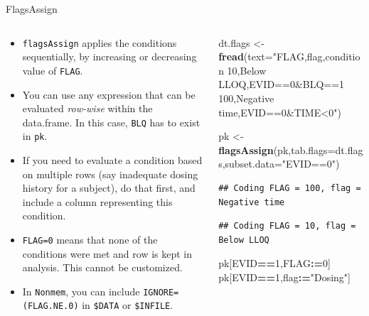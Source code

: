 \documentclass[
  8pt,
  ignorenonframetext,
  aspectratio=169]{beamer}
\newenvironment{Shaded}{\begin{snugshade}}{\end{snugshade}}
\newcommand{\DataTypeTok}[1]{\textcolor[rgb]{0.13,0.29,0.53}{#1}}
\newcommand{\DecValTok}[1]{\textcolor[rgb]{0.00,0.00,0.81}{#1}}
\newcommand{\ErrorTok}[1]{\textcolor[rgb]{0.64,0.00,0.00}{\textbf{#1}}}
\newcommand{\KeywordTok}[1]{\textcolor[rgb]{0.13,0.29,0.53}{\textbf{#1}}}
\newcommand{\NormalTok}[1]{#1}
\newcommand{\OperatorTok}[1]{\textcolor[rgb]{0.81,0.36,0.00}{\textbf{#1}}}
\newcommand{\StringTok}[1]{\textcolor[rgb]{0.31,0.60,0.02}{#1}}
\providecommand{\tightlist}{%
  \setlength{\itemsep}{0pt}\setlength{\parskip}{0pt}}
\begin{document}
\begin{frame}[fragile]{FlagsAssign}
\protect\hypertarget{flagsassign}{}
\begin{columns}[T]
\begin{column}{0.48\textwidth}
\begin{itemize}
\tightlist
\item
  \texttt{flagsAssign} applies the conditions sequentially, by
  increasing or decreasing value of \texttt{FLAG}.
\item
  You can use any expression that can be evaluated \emph{row-wise}
  within the data.frame. In this case, \texttt{BLQ} has to exist in
  \texttt{pk}.
\item
  If you need to evaluate a condition based on multiple rows (say
  inadequate dosing history for a subject), do that first, and include a
  column representing this condition.
\item
  \texttt{FLAG=0} means that none of the conditions were met and row is
  kept in analysis. This cannot be customized.
\item
  In \texttt{Nonmem}, you can include \texttt{IGNORE=(FLAG.NE.0)} in
  \texttt{\$DATA} or \texttt{\$INFILE}.
\end{itemize}
\end{column}

\begin{column}{0.48\textwidth}
\footnotesize

\begin{Shaded}
\begin{Highlighting}[]
\NormalTok{dt.flags \textless{}{-}}\StringTok{ }\KeywordTok{fread}\NormalTok{(}\DataTypeTok{text=}\StringTok{"FLAG,flag,condition}
\StringTok{10,Below LLOQ,EVID==0\&BLQ==1}
\StringTok{100,Negative time,EVID==0\&TIME\textless{}0"}\NormalTok{)}

\NormalTok{pk \textless{}{-}}\StringTok{ }\KeywordTok{flagsAssign}\NormalTok{(pk,}\DataTypeTok{tab.flags=}\NormalTok{dt.flags,}\DataTypeTok{subset.data=}\StringTok{"EVID==0"}\NormalTok{)}
\end{Highlighting}
\end{Shaded}

\begin{verbatim}
## Coding FLAG = 100, flag = Negative time
\end{verbatim}

\begin{verbatim}
## Coding FLAG = 10, flag = Below LLOQ
\end{verbatim}

\begin{Shaded}
\begin{Highlighting}[]
\NormalTok{pk[EVID}\OperatorTok{==}\DecValTok{1}\NormalTok{,FLAG}\OperatorTok{:}\ErrorTok{=}\DecValTok{0}\NormalTok{]}
\NormalTok{pk[EVID}\OperatorTok{==}\DecValTok{1}\NormalTok{,flag}\OperatorTok{:}\ErrorTok{=}\StringTok{"Dosing"}\NormalTok{]}
\end{Highlighting}
\end{Shaded}
\end{column}
\end{columns}
\end{frame}
\end{document}
